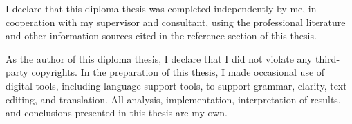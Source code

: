 
I declare that this diploma thesis was completed independently by me, in cooperation with my supervisor and consultant, using the professional literature and other information sources cited in the reference section of this thesis.

As the author of this diploma thesis, I declare that I did not violate any third-party copyrights. In the preparation of this thesis, I made occasional use of digital tools, including language-support tools, to support grammar, clarity, text editing, and translation. All analysis, implementation, interpretation of results, and conclusions presented in this thesis are my own.

